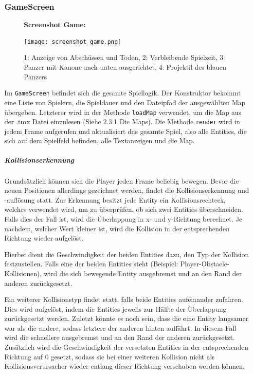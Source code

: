 \documentclass[a4paper]{scrreprt}
\def\code#1{\texttt{#1}}
\begin{document}
\subsubsection{GameScreen}
\begin{figure}[H]
  \textbf{Screenshot Game:}\par\medskip
  \centering
\texttt{[image: screenshot\_game.png]}    \caption{1: Anzeige von Abschüssen und Toden, 2: Verbleibende Spielzeit, 3: Panzer mit Kanone nach unten ausgerichtet, 4: Projektil des blauen Panzers}
\end{figure}
Im \code{GameScreen} befindet sich die gesamte Spiellogik. Der Konstruktor bekommt eine Liste von Spielern, die Spieldauer und den Dateipfad der ausgewählten Map übergeben.
Letzterer wird in der Methode \code{loadMap} verwendet, um die Map aus der .tmx Datei einzulesen (Siehe 2.3.1 Die Maps).
Die Methode \code{render} wird in jedem Frame aufgerufen und aktualisiert das gesamte Spiel, also alle Entities, die sich auf dem Spielfeld befinden, alle Textanzeigen und die Map.

\subparagraph{Kollisionserkennung} Grundsätzlich können sich die Player jeden Frame beliebig bewegen. Bevor die neuen Positionen allerdings gezeichnet werden, findet die Kollisionserkennung und -auflösung statt. Zur Erkennung besitzt jede Entity ein Kollisionsrechteck, welches verwendet wird, um zu überprüfen, ob sich zwei Entities überschneiden. Falls dies der Fall ist, wird die Überlappung in x- und y-Richtung berechnet. Je nachdem, welcher Wert kleiner ist, wird die Kollision in der entsprechenden Richtung wieder aufgelöst.

Hierbei dient die Geschwindigkeit der beiden Entities dazu, den Typ der Kollision festzustellen. Falls eine der beiden Entities steht (Beispiel: Player-Obstacle-Kollisionen), wird die sich bewegende Entity ausgebremst und an den Rand der anderen zurückgesetzt. 

Ein weiterer Kollisionstyp findet statt, falls beide Entities aufeinander zufahren. Dies wird aufgelöst, indem die Entities jeweils zur Hälfte der Überlappung zurückgesetzt werden. Zuletzt könnte es noch sein, dass die eine Entity langsamer war als die andere, sodass letztere der anderen hinten auffährt. In diesem Fall wird die schnellere ausgebremst und an den Rand der anderen zurückgesetzt. Zusätzlich wird die Geschwindigkeit der versetzten Entities in der entsprechenden Richtung auf 0 gesetzt, sodass sie bei einer weiteren Kollision nicht als Kollisionsverursacher wieder entlang dieser Richtung verschoben werden können.
\end{document}
